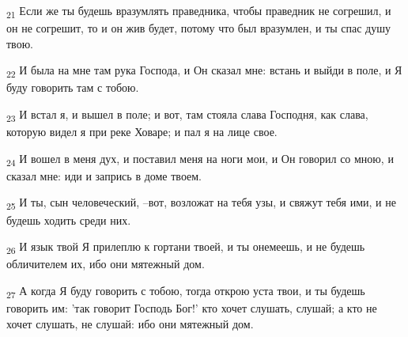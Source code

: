 \begin{tcolorbox}
\textsubscript{21} Если же ты будешь вразумлять праведника, чтобы праведник не согрешил, и он не согрешит, то и он жив будет, потому что был вразумлен, и ты спас душу твою.
\end{tcolorbox}
\begin{tcolorbox}
\textsubscript{22} И была на мне там рука Господа, и Он сказал мне: встань и выйди в поле, и Я буду говорить там с тобою.
\end{tcolorbox}
\begin{tcolorbox}
\textsubscript{23} И встал я, и вышел в поле; и вот, там стояла слава Господня, как слава, которую видел я при реке Ховаре; и пал я на лице свое.
\end{tcolorbox}
\begin{tcolorbox}
\textsubscript{24} И вошел в меня дух, и поставил меня на ноги мои, и Он говорил со мною, и сказал мне: иди и запрись в доме твоем.
\end{tcolorbox}
\begin{tcolorbox}
\textsubscript{25} И ты, сын человеческий, --вот, возложат на тебя узы, и свяжут тебя ими, и не будешь ходить среди них.
\end{tcolorbox}
\begin{tcolorbox}
\textsubscript{26} И язык твой Я прилеплю к гортани твоей, и ты онемеешь, и не будешь обличителем их, ибо они мятежный дом.
\end{tcolorbox}
\begin{tcolorbox}
\textsubscript{27} А когда Я буду говорить с тобою, тогда открою уста твои, и ты будешь говорить им: 'так говорит Господь Бог!' кто хочет слушать, слушай; а кто не хочет слушать, не слушай: ибо они мятежный дом.
\end{tcolorbox}
